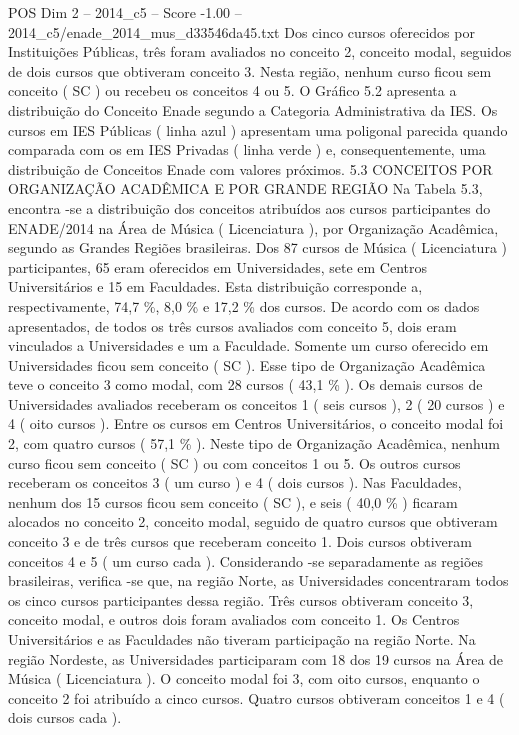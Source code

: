 \begin{textsample}{POS Dim 2 – 2014\_c5 – Score -1.00 – 2014\_c5/enade\_2014\_mus\_d33546da45.txt}
Dos cinco cursos oferecidos por Instituições Públicas, três foram avaliados no conceito 2, conceito modal, seguidos de dois cursos que obtiveram conceito 3.
Nesta região, nenhum curso ficou sem conceito ( SC ) ou recebeu os conceitos 4 ou 5.
O Gráfico 5.2 apresenta a distribuição do Conceito Enade segundo a Categoria Administrativa da IES.
Os cursos em IES Públicas ( linha azul ) apresentam uma poligonal parecida quando comparada com os em IES Privadas ( linha verde ) e, consequentemente, uma distribuição de Conceitos Enade com valores próximos. 5.3 CONCEITOS POR ORGANIZAÇÃO ACADÊMICA E POR GRANDE REGIÃO Na Tabela 5.3, encontra -se a distribuição dos conceitos atribuídos aos cursos participantes do ENADE/2014 na Área de Música ( Licenciatura ), por Organização Acadêmica, segundo as Grandes Regiões brasileiras.
Dos 87 cursos de Música ( Licenciatura ) participantes, 65 eram oferecidos em Universidades, sete em Centros Universitários e 15 em Faculdades.
Esta distribuição corresponde a, respectivamente, 74,7 \%, 8,0 \% e 17,2 \% dos cursos.
De acordo com os dados apresentados, de todos os três cursos avaliados com conceito 5, dois eram vinculados a Universidades e um a Faculdade.
Somente um curso oferecido em Universidades ficou sem conceito ( SC ).
Esse tipo de Organização Acadêmica teve o conceito 3 como modal, com 28 cursos ( 43,1 \% ).
Os demais cursos de Universidades avaliados receberam os conceitos 1 ( seis cursos ), 2 ( 20 cursos ) e 4 ( oito cursos ).
Entre os cursos em Centros Universitários, o conceito modal foi 2, com quatro cursos ( 57,1 \% ).
Neste tipo de Organização Acadêmica, nenhum curso ficou sem conceito ( SC ) ou com conceitos 1 ou 5.
Os outros cursos receberam os conceitos 3 ( um curso ) e 4 ( dois cursos ).
Nas Faculdades, nenhum dos 15 cursos ficou sem conceito ( SC ), e seis ( 40,0 \% ) ficaram alocados no conceito 2, conceito modal, seguido de quatro cursos que obtiveram conceito 3 e de três cursos que receberam conceito 1.
Dois cursos obtiveram conceitos 4 e 5 ( um curso cada ).
Considerando -se separadamente as regiões brasileiras, verifica -se que, na região Norte, as Universidades concentraram todos os cinco cursos participantes dessa região.
Três cursos obtiveram conceito 3, conceito modal, e outros dois foram avaliados com conceito 1.
Os Centros Universitários e as Faculdades não tiveram participação na região Norte.
Na região Nordeste, as Universidades participaram com 18 dos 19 cursos na Área de Música ( Licenciatura ).
O conceito modal foi 3, com oito cursos, enquanto o conceito 2 foi atribuído a cinco cursos.
Quatro cursos obtiveram conceitos 1 e 4 ( dois cursos cada ).

\end{textsample}
